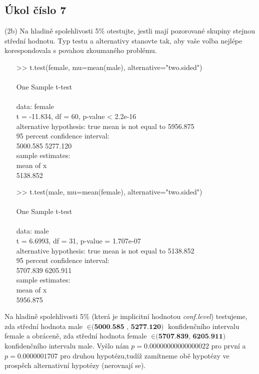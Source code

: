 \documentclass[paper=a4, fontsize=12pt]{scrartcl}
\numberwithin{equation}{section}		%
\numberwithin{figure}{section}			%
\numberwithin{table}{section}				%
\begin{document}
\newpage
\subsection{Úkol číslo 7}
(2b) Na hladině spolehlivosti 5\% otestujte, jestli mají pozorované skupiny stejnou střední hodnotu.
Typ testu a alternativy stanovte tak, aby vaše volba nejlépe korespondovala s povahou zkoumaného problému.
\begin{itemize}
	\item [>>] t.test(female, mu=mean(male), alternative="two.sided")\\
	\\
	One Sample t-test\\
	\\
	data:  female\\
	t = -11.834, df = 60, p-value < 2.2e-16\\
	alternative hypothesis: true mean is not equal to 5956.875\\
	95 percent confidence interval:\\
 	5000.585 5277.120\\
	sample estimates:\\
	mean of x\\
 	5138.852\\

	\item [>>] t.test(male, mu=mean(female), alternative="two.sided")\\
	\\
	One Sample t-test\\
	\\
	data:  male\\
	t = 6.6993, df = 31, p-value = 1.707e-07\\
	alternative hypothesis: true mean is not equal to 5138.852\\
	95 percent confidence interval:\\
	5707.839 6205.911\\
	sample estimates:\\
	mean of x\\
	5956.875\\

\end{itemize}
Na hladině spolehlivosti 5\% (která je implicitní hodnotou \textit{conf.level}) testujeme, zda střední hodnota male $\in \textbf{(5000.585 , 5277.120)}$  konfidenčního intervalu female a 
obráceně, zda  střední hodnota female $\in \textbf{(5707.839, 6205.911)}$  konfidenčního intervalu male. Vyšlo nám $p = 0.00000000000000022$ pro první a
$p =  0.0000001707$ pro druhou hypotézu,tudíž zamítneme obě hypotézy ve prospěch alternativní hypotézy (nerovnají se).


\end{document}
